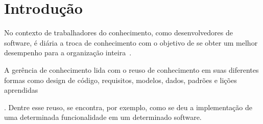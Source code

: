 \chapter{Introdução}







No contexto de trabalhadores do conhecimento, como desenvolvedores de software, é diária a troca de conhecimento com o objetivo de se obter um melhor desempenho para a organização inteira~\cite{Levy2009}. A gerência de conhecimento lida com o reuso de conhecimento em  suas diferentes formas como design de código, requisitos, modelos, dados, padrões e lições aprendidas~\cite{Levy2009}. Dentre esse reuso, se encontra, por exemplo, como se deu a implementação de uma determinada funcionalidade em um determinado software.




